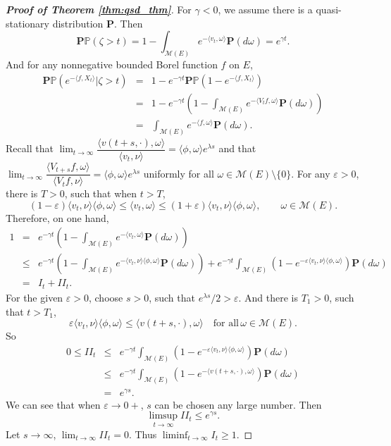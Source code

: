 \documentclass[12pt,a4paper]{amsart}
\numberwithin{equation}{section}
\theoremstyle{plain}
\theoremstyle{definition}
\begin{document}
\begin{proof}[{\bf Proof of Theorem \ref{thm:qsd_thm}}]
  For $\gamma<0$, we assume there is a quasi-stationary distribution $\mathbf P$.  Then
  \[
    \mathbf P\mathbb P(\zeta>t)=1-\int_{\mathcal M(E)}e^{-\langle v_t,\omega\rangle }\mathbf P(d\omega)=e^{\gamma t}.
  \]
  And for any nonnegative bounded Borel function $f$ on $E$,
  \begin{eqnarray*}
    \mathbf P\mathbb P\left(e^{-\langle f, X_t\rangle }\big|\zeta>t\right)&=&1-e^{-\gamma t}\mathbf P\mathbb P\left(1-e^{-\langle f, X_t\rangle }\right)\\
                                                                          &=&1-e^{-\gamma t}\left(1-\int_{\mathcal M(E)}e^{-\langle V_tf,\omega\rangle }\mathbf P(d\omega)\right)\\
                                                                          &=&\int_{\mathcal M(E)}e^{-\langle f,\omega\rangle }\mathbf P(d\omega).
  \end{eqnarray*}
  Recall that $\lim_{t\rightarrow\infty}\dfrac{\langle v(t+s,\cdot),\omega\rangle }{\langle v_t,\nu\rangle }=\langle \phi,\omega\rangle e^{\lambda s} $ and that $\lim_{t\rightarrow\infty}\dfrac{\langle V_{t+s}f,\omega\rangle }{\langle V_tf,\nu\rangle }=\langle \phi,\omega\rangle e^{\lambda s}$ uniformly for all $\omega\in \mathcal M(E)\setminus\{0\}$.  For any $\varepsilon>0$, there is $T>0$, such that when $t>T$,
  \[
    (1-\varepsilon)\langle v_t,\nu\rangle \langle \phi,\omega\rangle\leq \langle v_t,\omega\rangle\leq (1+\varepsilon)\langle v_t,\nu\rangle \langle \phi,\omega\rangle,\qquad \omega\in\mathcal M(E).
  \]
  Therefore, on one hand,
  \begin{eqnarray*}
    1&=&e^{-\gamma t}\left(1-\int_{\mathcal M(E)}e^{-\langle v_t,\omega\rangle }\mathbf P(d\omega)\right)\\
     &\leq &e^{-\gamma t}\left(1-\int_{\mathcal M(E)}e^{-\langle v_t,\nu\rangle\langle\phi,\omega\rangle }\mathbf P(d\omega)\right)+e^{-\gamma t}\int_{\mathcal M(E)}\left(1-e^{-\varepsilon\langle v_t,\nu\rangle\langle\phi,\omega\rangle  }\right)\mathbf P(d\omega)\\
     &=&I_t+II_t.
  \end{eqnarray*}
  For the given $\varepsilon>0$, choose $s>0$, such that $e^{\lambda s}/2>\varepsilon$.  And there is $T_1>0$, such that $t>T_1$,
  \[
    \varepsilon\langle v_t,\nu\rangle\langle\phi,\omega\rangle\leq \langle v(t+s,\cdot),\omega\rangle \quad\mbox{for all}\, \omega\in\mathcal M(E).
  \]
  So
  \begin{eqnarray*}
    0\leq II_t&\leq& e^{-\gamma t}\int_{\mathcal M(E)}\left(1-e^{-\varepsilon\langle v_t,\nu\rangle\langle\phi,\omega\rangle  }\right)\mathbf P(d\omega)\\
              &\leq& e^{-\gamma t}\int_{\mathcal M(E)}\left(1-e^{-\langle v(t+s,\cdot),\omega\rangle  }\right)\mathbf P(d\omega)\\
              &=&e^{\gamma s}.
  \end{eqnarray*}
  We can see that when $\varepsilon\to0+$, $s$ can be chosen any large number.  Then
  \[
    \limsup_{t\to\infty}II_t\leq e^{\gamma s}.
  \]
  Let $s\to\infty$, $\lim_{t\to\infty}II_t=0$. Thus $\liminf_{t\to\infty}I_t\geq 1$.


\end{proof}
\end{document}
